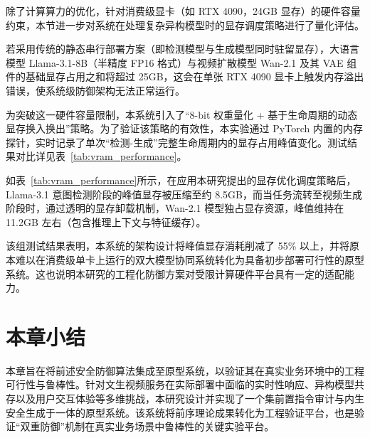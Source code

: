 除了计算算力的优化，针对消费级显卡（如 RTX 4090，24GB 显存）的硬件容量约束，本节进一步对系统在处理复杂异构模型时的显存调度策略进行了量化评估。

若采用传统的静态串行部署方案（即检测模型与生成模型同时驻留显存），大语言模型 Llama-3.1-8B（半精度 FP16 格式）与视频扩散模型 Wan-2.1 及其 VAE 组件的基础显存占用之和将超过 25GB，这会在单张 RTX 4090 显卡上触发内存溢出错误，使系统级防御架构无法正常运行。

为突破这一硬件容量限制，本系统引入了“8-bit 权重量化 + 基于生命周期的动态显存换入换出”策略。为了验证该策略的有效性，本实验通过 PyTorch 内置的内存探针，实时记录了单次“检测-生成”完整生命周期内的显存占用峰值变化。测试结果对比详见表~\ref{tab:vram_performance}。

\begin{table}[htbp]
\centering
{}
\label{tab:vram_performance}
\end{table}

如表~\ref{tab:vram_performance}所示，在应用本研究提出的显存优化调度策略后，Llama-3.1 意图检测阶段的峰值显存被压缩至约 8.5GB，而当任务流转至视频生成阶段时，通过透明的显存卸载机制，Wan-2.1 模型独占显存资源，峰值维持在 11.2GB 左右（包含推理上下文与特征缓存）。

该组测试结果表明，本系统的架构设计将峰值显存消耗削减了 55\% 以上，并将原本难以在消费级单卡上运行的双大模型协同系统转化为具备初步部署可行性的原型系统。这也说明本研究的工程化防御方案对受限计算硬件平台具有一定的适配能力。

\section{本章小结}

本章旨在将前述安全防御算法集成至原型系统，以验证其在真实业务环境中的工程可行性与鲁棒性。针对文生视频服务在实际部署中面临的实时性响应、异构模型共存以及用户交互体验等多维挑战，本研究设计并实现了一个集前置指令审计与内生安全生成于一体的原型系统。该系统将前序理论成果转化为工程验证平台，也是验证“双重防御”机制在真实业务场景中鲁棒性的关键实验平台。

